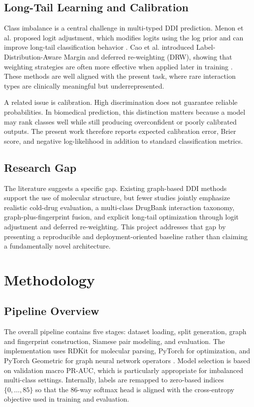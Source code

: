 \documentclass[12pt,a4paper]{report}
\begin{document}
\section{Long-Tail Learning and Calibration}
Class imbalance is a central challenge in multi-typed DDI prediction. Menon et al. proposed logit adjustment, which modifies logits using the log prior and can improve long-tail classification behavior \cite{menon2021logit}. Cao et al. introduced Label-Distribution-Aware Margin and deferred re-weighting (DRW), showing that weighting strategies are often more effective when applied later in training \cite{cao2019ldam}. These methods are well aligned with the present task, where rare interaction types are clinically meaningful but underrepresented.

A related issue is calibration. High discrimination does not guarantee reliable probabilities. In biomedical prediction, this distinction matters because a model may rank classes well while still producing overconfident or poorly calibrated outputs. The present work therefore reports expected calibration error, Brier score, and negative log-likelihood in addition to standard classification metrics.

\section{Research Gap}
The literature suggests a specific gap. Existing graph-based DDI methods support the use of molecular structure, but fewer studies jointly emphasize realistic cold-drug evaluation, a multi-class DrugBank interaction taxonomy, graph-plus-fingerprint fusion, and explicit long-tail optimization through logit adjustment and deferred re-weighting. This project addresses that gap by presenting a reproducible and deployment-oriented baseline rather than claiming a fundamentally novel architecture.

\chapter{Methodology}
\section{Pipeline Overview}
The overall pipeline contains five stages: dataset loading, split generation, graph and fingerprint construction, Siamese pair modeling, and evaluation. The implementation uses RDKit for molecular parsing, PyTorch for optimization, and PyTorch Geometric for graph neural network operators \cite{fey2019pyg}. Model selection is based on validation macro PR-AUC, which is particularly appropriate for imbalanced multi-class settings. Internally, labels are remapped to zero-based indices \(\{0,\dots,85\}\) so that the 86-way softmax head is aligned with the cross-entropy objective used in training and evaluation.
\end{document}
